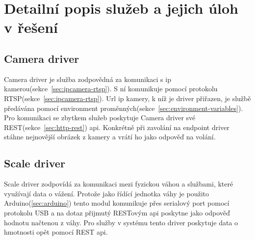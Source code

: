 \section{Detailní popis služeb a jejich úloh v řešení}

\subsection{Camera driver}
Camera driver je služba zodpovědná za komunikaci s ip kamerou(sekce~\ref{sec:ipcamera-rtsp}).\newline
S ní komunikuje pomocí protokolu RTSP(sekce~\ref{sec:ipcamera-rtsp}).
Url ip kamery, k níž je driver přiřazen, je službě předávána pomocí environment proměnných(sekce~\ref{sec:environment-variables}).
Pro komunikaci se zbytkem služeb poskytuje Camera driver své REST(sekce~\ref{sec:http-rest}) api.
Konkrétně při zavolání na endpoint driver stáhne nejnovější obrázek z kamery a vrátí ho jako odpověď na volání.

\subsection{Scale driver}
Scale driver zodpovídá za komunikaci mezi fyzickou váhou a službami, které využívají data o vážení.\newline
Protože jako řídící jednotka váhy je použito Arduino(\ref{sec:arduino}) tento modul komunikuje přes serialový port pomocí protokolu USB a na dotaz přijmutý RESTovým api poskytne jako odpověď hodnotu načtenou z váhy.
Pro služby v systému tento driver poskytuje data o hmotnosti opět pomocí REST api.

